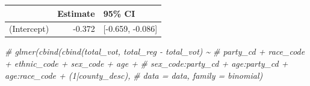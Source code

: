 \documentclass[
]{article}
\newenvironment{Shaded}{\begin{snugshade}}{\end{snugshade}}
\newcommand{\AttributeTok}[1]{\textcolor[rgb]{0.77,0.63,0.00}{#1}}
\newcommand{\CommentTok}[1]{\textcolor[rgb]{0.56,0.35,0.01}{\textit{#1}}}
\newcommand{\ConstantTok}[1]{\textcolor[rgb]{0.00,0.00,0.00}{#1}}
\newcommand{\DecValTok}[1]{\textcolor[rgb]{0.00,0.00,0.81}{#1}}
\newcommand{\FloatTok}[1]{\textcolor[rgb]{0.00,0.00,0.81}{#1}}
\newcommand{\FunctionTok}[1]{\textcolor[rgb]{0.00,0.00,0.00}{#1}}
\newcommand{\NormalTok}[1]{#1}
\newcommand{\OtherTok}[1]{\textcolor[rgb]{0.56,0.35,0.01}{#1}}
\newcommand{\SpecialCharTok}[1]{\textcolor[rgb]{0.00,0.00,0.00}{#1}}
\newcommand{\StringTok}[1]{\textcolor[rgb]{0.31,0.60,0.02}{#1}}
\begin{document}
\begin{Shaded}
\end{Shaded}

\begin{table}
\centering
\begin{tabular}{l|r|l}
\hline
  & Estimate & 95\% CI\\
\hline
(Intercept) & -0.372 & [-0.659, -0.086]\\
\hline
\end{tabular}
\end{table}

\begin{Shaded}
\begin{Highlighting}[]
 \CommentTok{\# glmer(cbind(cbind(total\_vot, total\_reg {-} total\_vot) \textasciitilde{}}
 \CommentTok{\#                  party\_cd + race\_code + ethnic\_code + sex\_code + age +}
 \CommentTok{\#                  sex\_code:party\_cd + age:party\_cd + age:race\_code + (1|county\_desc),}
 \CommentTok{\#                data = data, family = binomial)}
\end{Highlighting}
\end{Shaded}
\end{document}
